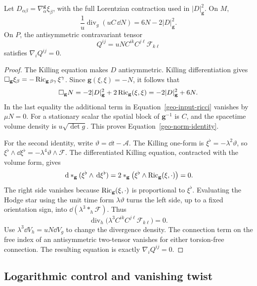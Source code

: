 \begin{lemma}
\label{geo-killing-identities}
Let $D_{\alpha\beta}=\nabla^{\mathbf g}_\alpha\xi_\beta$, with the full
Lorentzian contraction used in $|D|_{\mathbf g}^2$.  On $M$,
\begin{equation}
 \frac1u\operatorname{div}_g(uC\,\dd N)
       =6N-2|D|_{\mathbf g}^2.
 \label{geo-norm-identity}
\end{equation}
On $P$, the antisymmetric contravariant tensor
\begin{equation}
 Q^{ij}=uN C^{ik}C^{j\ell}\mathcal F_{k\ell}
 \label{geo-Q}
\end{equation}
satisfies $\nabla_iQ^{ij}=0$.
\end{lemma}
\begin{proof}
The Killing equation makes $D$ antisymmetric.  Killing differentiation gives
$\Box_{\mathbf g}\xi_\beta=-\operatorname{Ric}_{\mathbf g\,\beta\gamma}\xi^\gamma$.
Since $\mathbf g(\xi,\xi)=-N$, it follows that
\[
 \Box_{\mathbf g}N
 =-2|D|_{\mathbf g}^2+2\operatorname{Ric}_{\mathbf g}(\xi,\xi)
 =-2|D|_{\mathbf g}^2+6N.
\]
In the last equality the additional term in
Equation~\eqref{geo-input-ricci} vanishes by $\mu N=0$.  For a stationary
scalar the spatial block of $\mathbf g^{-1}$ is $C$, and the spacetime volume
density is $u\sqrt{\det g}$.  This proves Equation~\eqref{geo-norm-identity}.

For the second identity, write $\vartheta=\dd t-\mathcal A$.
The Killing one-form is $\xi^\flat=-\lambda^2\vartheta$, so
$\xi^\flat\wedge\dd\xi^\flat=-\lambda^4\vartheta\wedge\mathcal F$.
The differentiated Killing equation, contracted with the volume form, gives
\[
 \,\mathrm d *_{\mathbf g}(\xi^\flat\wedge\,\mathrm d\xi^\flat)
       =2*_{\mathbf g}\bigl(\xi^\flat\wedge\operatorname{Ric}_{\mathbf g}(\xi,\cdot)\bigr)
       =0.
\]
The right side vanishes because $\operatorname{Ric}_{\mathbf g}(\xi,\cdot)$ is proportional
to $\xi^\flat$.  Evaluating the Hodge star using the unit time form
$\lambda\vartheta$ turns the left side, up to a fixed orientation sign, into
$\dd(\lambda^3 *_h\mathcal F)$.  Thus
\[
 \operatorname{div}_h\bigl(\lambda^3 C^{ik}C^{j\ell}
                                      \mathcal F_{k\ell}\bigr)=0.
\]
Use $\lambda^3\dd V_h=uN\dd V_g$ to change the divergence density.  The
connection term on the free index of an antisymmetric two-tensor vanishes
for either torsion-free connection.  The resulting equation is exactly
$\nabla_iQ^{ij}=0$.
\end{proof}

\subsection{Logarithmic control and vanishing twist}

